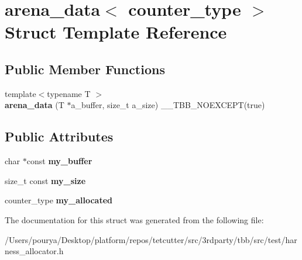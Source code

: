 \hypertarget{structarena__data}{}\section{arena\+\_\+data$<$ counter\+\_\+type $>$ Struct Template Reference}
\label{structarena__data}
\subsection*{Public Member Functions}
\begin{DoxyCompactItemize}
\item 
\hypertarget{structarena__data_a2310874e311552e8d4a49cdd42765313}{}{\footnotesize template$<$typename T $>$ }\\{\bfseries arena\+\_\+data} (T $\ast$a\+\_\+buffer, size\+\_\+t a\+\_\+size) \+\_\+\+\_\+\+T\+B\+B\+\_\+\+N\+O\+E\+X\+C\+E\+P\+T(true)\label{structarena__data_a2310874e311552e8d4a49cdd42765313}

\end{DoxyCompactItemize}
\subsection*{Public Attributes}
\begin{DoxyCompactItemize}
\item 
\hypertarget{structarena__data_a09bd7674946d6bad7f10ec2d8fb05633}{}char $\ast$const {\bfseries my\+\_\+buffer}\label{structarena__data_a09bd7674946d6bad7f10ec2d8fb05633}

\item 
\hypertarget{structarena__data_a15f2087fc0ba7ca2ac3cac90a30cb067}{}size\+\_\+t const {\bfseries my\+\_\+size}\label{structarena__data_a15f2087fc0ba7ca2ac3cac90a30cb067}

\item 
\hypertarget{structarena__data_af5a27f7c30b6d76f956266571f3a9a6b}{}counter\+\_\+type {\bfseries my\+\_\+allocated}\label{structarena__data_af5a27f7c30b6d76f956266571f3a9a6b}

\end{DoxyCompactItemize}


The documentation for this struct was generated from the following file\+:\begin{DoxyCompactItemize}
\item 
/\+Users/pourya/\+Desktop/platform/repos/tetcutter/src/3rdparty/tbb/src/test/harness\+\_\+allocator.\+h\end{DoxyCompactItemize}
